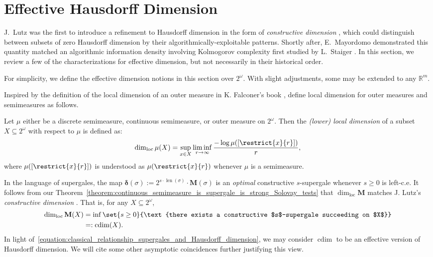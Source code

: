 \section{Effective Hausdorff Dimension} \label{section:Effective_Hausdorff_Dimension}
J.~Lutz was the first to introduce a refinement to Hausdorff dimension in the form of \textit{constructive dimension} \cite{Lut00}, which could distinguish between subsets of zero Hausdorff dimension by their algorithmically-exploitable patterns. Shortly after, E.~Mayordomo demonstrated this quantity matched an algorithmic information density involving Kolmogorov complexity first studied by L.~Staiger \cite{May02, Sta89}. In this section, we review a few of the characterizations for effective dimension, but not necessarily in their historical order.


For simplicity, we define the effective dimension notions in this section over $2^\omega$. With slight adjustments, some may be extended to any $\mathbb{R}^m$.

Inspired by the definition of the local dimension of an outer measure in K. Falconer's book \cite{Fal90}, define local dimension for outer measures and semimeasures as follows.

\begin{definition}
    Let $\mu$ either be a discrete semimeasure, continuous semimeasure, or outer measure on $2^\omega$. Then the \textit{(lower) local dimension} of a subset $X \subseteq 2^\omega$ with respect to $\mu$ is defined as:
    \begin{align*}
        \dim_{\operatorname{loc}} \mu(X) = \sup_{x \in X} \liminf_{r \to \infty} \frac{-\log \mu([\restrict{x}{r}])}{r},
    \end{align*}
    where $\mu([\restrict{x}{r}])$ is understood as $\mu(\restrict{x}{r})$ whenever $\mu$ is a semimeasure.
\end{definition}

In the language of supergales, the map $\boldsymbol{\delta}(\sigma) := 2^{s \cdot \operatorname{len}(\sigma)} \cdot \mathbf{M}(\sigma)$ is an \textit{optimal} constructive $s$-supergale whenever $s \geq 0$ is left-c.e. It follows from our Theorem~\ref{theorem:continuous_semimeasure_is_supergale_is_strong_Solovay_tests} that  $\dim_{\operatorname{loc}} \mathbf{M}$ matches J. Lutz's \textit{constructive dimension} \cite{Lut00, Lut03}. That is, for any $X \subseteq 2^\omega$,
\begin{align*}
    \dim_{\operatorname{loc}} \mathbf{M}(X) &= \inf \set{s \geq 0}{\text{there exists a constructive $s$-supergale succeeding on $X$}}\\
    &=: \operatorname{cdim}(X).
\end{align*}
In light of~\eqref{equation:classical_relationship_supergales_and_Hausdorff_dimension}, we may consider $\operatorname{cdim}$ to be an effective version of Hausdorff dimension. We will cite some other asymptotic coincidences further justifying this view. 

